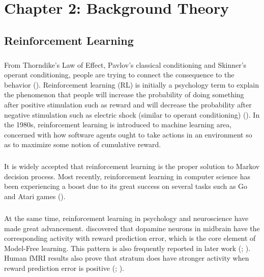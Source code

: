 
\chapter{Chapter 2: Background Theory} %

\label{Chapter 2} %

\section{Reinforcement Learning}
\paragraph{}
From Thorndike's Law of Effect, Pavlov's classical conditioning and Skinner's operant conditioning, people are trying to connect the consequence to the behavior (\cite{thorndike1927law}). Reinforcement learning (RL) is initially a psychology term to explain the phenomenon that people will increase the probability of doing something after positive stimulation such as reward and will decrease the probability after negative stimulation such as electric shock (similar to operant conditioning) (\cite{dayan2002reward}). In the 1980s, reinforcement learning is introduced to machine learning area, concerned with how software agents ought to take actions in an environment so as to maximize some notion of cumulative reward. 
\paragraph{}
It is widely accepted that reinforcement learning is the proper solution to Markov decision process. Most recently, reinforcement learning in computer science has been experiencing a boost due to its great success on several tasks such as Go and Atari games (\cite{mnih2015human}). 
\paragraph{}
At the same time, reinforcement learning in psychology and neuroscience have made great advancement. \citet{hollerman1998dopamine} discovered that dopamine neurons in midbrain have the corresponding activity with reward prediction error, which is the core element of Model-Free learning. This pattern is also frequently reported in later work (\cite{bayer2005midbrain}; \cite{waelti2001dopamine}). Human fMRI results also prove that stratum does have stronger activity when reward prediction error is positive (\cite{garrison2013prediction}; \cite{kishida2016subsecond}). 
